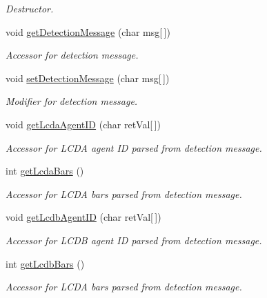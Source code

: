 \begin{DoxyCompactItemize}
\begin{DoxyCompactList}\small\item\em Destructor. \end{DoxyCompactList}\item 
void \hyperlink{class_anaconda_detection_belief_a79cb61174222d6181c9e9e5dcf932606}{getDetectionMessage} (char msg\mbox{[}$\,$\mbox{]})
\begin{DoxyCompactList}\small\item\em Accessor for detection message. \end{DoxyCompactList}\item 
void \hyperlink{class_anaconda_detection_belief_a9a139a40efa81384f52e4d0c109bc3b0}{setDetectionMessage} (char msg\mbox{[}$\,$\mbox{]})
\begin{DoxyCompactList}\small\item\em Modifier for detection message. \end{DoxyCompactList}\item 
void \hyperlink{class_anaconda_detection_belief_a7ca0e63c930a766c558ec3632228bdc3}{getLcdaAgentID} (char retVal\mbox{[}$\,$\mbox{]})
\begin{DoxyCompactList}\small\item\em Accessor for LCDA agent ID parsed from detection message. \end{DoxyCompactList}\item 
int \hyperlink{class_anaconda_detection_belief_a6ae60cd7b973cf9f92f6ab8fe6ad2980}{getLcdaBars} ()
\begin{DoxyCompactList}\small\item\em Accessor for LCDA bars parsed from detection message. \end{DoxyCompactList}\item 
void \hyperlink{class_anaconda_detection_belief_ab1576b46dff2d17a528839fd1d4f7aa4}{getLcdbAgentID} (char retVal\mbox{[}$\,$\mbox{]})
\begin{DoxyCompactList}\small\item\em Accessor for LCDB agent ID parsed from detection message. \end{DoxyCompactList}\item 
int \hyperlink{class_anaconda_detection_belief_a32a36124c707cd78fea96cbb1c449c30}{getLcdbBars} ()
\begin{DoxyCompactList}\small\item\em Accessor for LCDA bars parsed from detection message. \end{DoxyCompactList}\item 

\end{DoxyCompactItemize}
